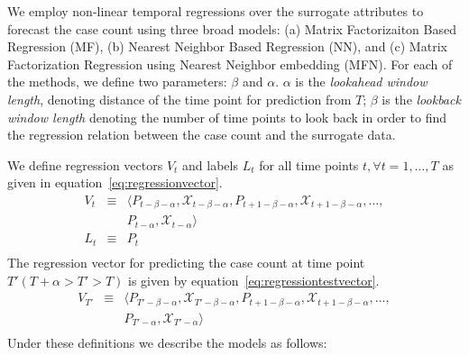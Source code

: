 
We employ non-linear temporal regressions over the surrogate attributes to forecast the
case count using three broad models:
(a) Matrix Factorizaiton Based Regression (MF),
(b) Nearest Neighbor Based Regression (NN),  and
(c)  Matrix Factorization Regression using Nearest Neighbor embedding (MFN).
For each of the methods, we define two parameters: $\beta$ and $\alpha$. 
$\alpha$ is the {\it lookahead window length}, denoting distance of the time point for prediction from $T$;
$\beta$ is the {\it lookback window length} denoting the number of time points to look back
in order to find the regression relation between the case count and the surrogate data.

We define regression vectors $V_t$  and 
labels $L_t$ for all time points $t, \forall t = 1,\dots, T$
as given in equation~\ref{eq:regressionvector}.
\vspace{-1em}
\begin{equation}
  \label{eq:regressionvector}
  \begin{array}{lcl}
    V_t & \equiv & \langle P_{t-\beta - \alpha}, \mathcal{X}_{t-\beta - \alpha}, P_{t + 1 -\beta-\alpha}, \mathcal{X}_{t + 1 - \beta-\alpha}, \dots, \\
        &        & P_{t-\alpha},\mathcal{X}_{t-\alpha} \rangle \\
    L_t & \equiv & P_{t}\\
  \end{array}
\end{equation}
The regression vector for predicting the case count at time point $T' (T +
\alpha > T' > T)$ is given by equation~\ref{eq:regressiontestvector}.
\begin{equation}
  \label{eq:regressiontestvector}
  \begin{array}{lcl}
    V_{T'} & \equiv & \langle P_{T'-\beta - \alpha}, \mathcal{X}_{T'-\beta - \alpha}, P_{t + 1 -\beta-\alpha}, \mathcal{X}_{t + 1 - \beta-\alpha}, \dots, \\
           &        & P_{T'-\alpha},\mathcal{X}_{T'-\alpha} \rangle \\
  \end{array}
\end{equation}
\noindent
Under these definitions we describe the models as follows:
